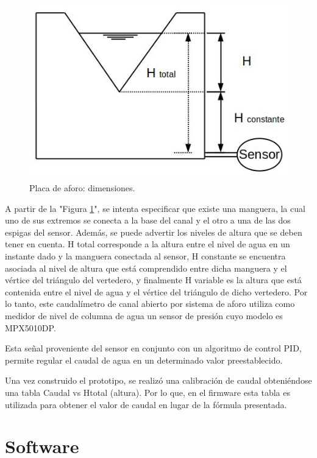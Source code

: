 \begin{figure}[htpb]
\centering
\includegraphics[scale=.75]{./Figures/AlturaVertedero.png}
\caption{Placa de aforo: dimensiones.}
\label{fig:alturas vertedero}
\end{figure}

A partir de la "Figura \ref{fig:alturas vertedero}", se intenta especificar que existe una manguera, la cual uno de sus extremos se conecta a la base del canal y el otro a una de las dos espigas del sensor. Además, se puede advertir los niveles de altura que se deben tener en cuenta. H total corresponde a la altura entre el nivel de agua en un instante dado y la manguera conectada al sensor, H constante se encuentra asociada al nivel de altura que está comprendido entre dicha manguera y el vértice del triángulo del vertedero, y finalmente H variable es la altura que está contenida entre el nivel de agua y el vértice del triángulo de dicho vertedero.    
Por lo tanto, este caudalímetro de canal abierto por sistema de aforo utiliza como medidor de nivel de columna de agua un sensor de presión cuyo modelo es MPX5010DP. 

Esta señal proveniente del sensor en conjunto con un algoritmo de control PID, permite regular el caudal de agua en un determinado valor preestablecido. 

Una vez construido el prototipo, se realizó una calibración de caudal obteniéndose una tabla Caudal vs Htotal (altura). Por lo que, en el firmware esta tabla es utilizada para obtener el valor de caudal  en lugar de la fórmula presentada.

\section{Software}
